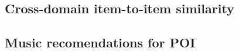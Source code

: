 \documentclass{llncs}
\begin{document}
\subsection{Cross-domain item-to-item similarity}
\label{cross_domain_similarity}


\subsection{Music recomendations for POI}
\label{ricci_kaminskass}
%
%
%
%
%
%
\end{document}
